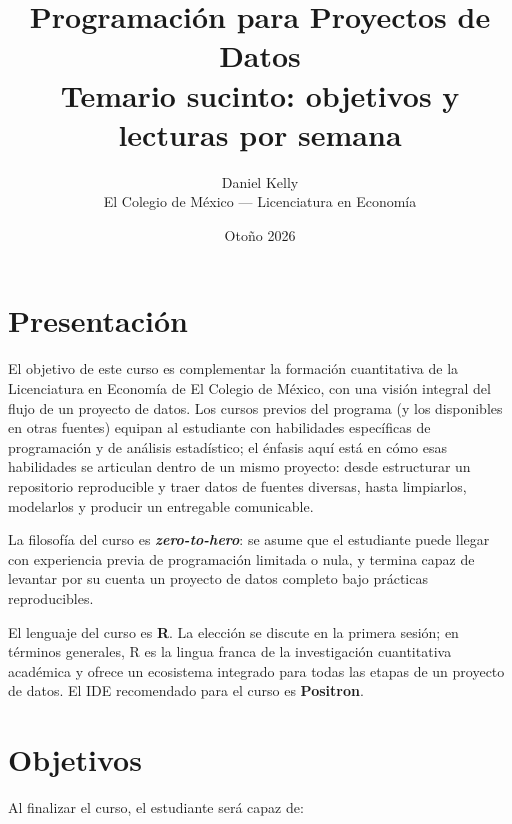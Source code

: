 \documentclass[11pt,letterpaper]{article}
\title{\color{main}\textbf{Programación para Proyectos de Datos}\\[0.3em]
       \large\color{subtitle}Temario sucinto: objetivos y lecturas por semana}
\author{Daniel Kelly\\
        \small El Colegio de México --- Licenciatura en Economía}
\date{Otoño 2026}
\newcommand{\blue}[1]{{\color{cerulean}#1}}
\newcommand{\orange}[1]{{\color{redorange}#1}}
\begin{document}
\maketitle

\section{Presentación}

El objetivo de este curso es complementar la formación cuantitativa de la Licenciatura en Economía de El Colegio de México, con una visión integral del flujo de un proyecto de datos. Los cursos previos del programa (y los disponibles en otras fuentes) equipan al estudiante con \blue{habilidades específicas} de programación y de análisis estadístico; el énfasis aquí está en cómo esas habilidades se \orange{articulan dentro de un mismo proyecto}: desde estructurar un repositorio reproducible y traer datos de fuentes diversas, hasta limpiarlos, modelarlos y producir un entregable comunicable.

La filosofía del curso es \textbf{\textit{zero-to-hero}}: se asume que el estudiante puede llegar con experiencia previa de programación limitada o nula, y termina capaz de levantar por su cuenta un proyecto de datos completo bajo prácticas reproducibles.

El lenguaje del curso es \textbf{R}. La elección se discute en la primera sesión; en términos generales, R es la lingua franca de la investigación cuantitativa académica y ofrece un ecosistema integrado para todas las etapas de un proyecto de datos. El IDE recomendado para el curso es \textbf{Positron}.

\section{Objetivos}

Al finalizar el curso, el estudiante será capaz de:
\end{document}

